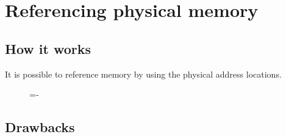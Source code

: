 \documentclass[a4paper]{systems-software}
\begin{document}
\newpage

\section*{Referencing physical memory}

\subsection*{How it works}

It is possible to reference memory by using the physical address locations.

\begin{figure}[H]
  \lineskip=-\fboxrule
\end{figure}


\subsection*{Drawbacks}
\end{document}
